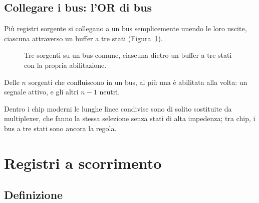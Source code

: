 \subsection{Collegare i bus: l'OR di bus}

Più registri sorgente si collegano a un bus semplicemente unendo le loro
uscite, ciascuna attraverso un buffer a tre stati
(Figura~\ref{fig:rb:busor}).

\begin{figure}[htb]
\centering
{}
\caption{Tre sorgenti su un bus comune, ciascuna dietro un buffer a tre stati
con la propria abilitazione.}
\label{fig:rb:busor}
\end{figure}

\begin{prgconcept}
Delle $n$ sorgenti che confluiscono in un bus, al più una è abilitata alla
volta: un segnale attivo, e gli altri $n-1$ neutri.
\end{prgconcept}

Dentro i chip moderni le lunghe linee condivise sono di solito sostituite da
multiplexer, che fanno la stessa selezione senza stati di alta impedenza; tra
chip, i bus a tre stati sono ancora la regola.

\section{Registri a scorrimento}

\subsection{Definizione}

